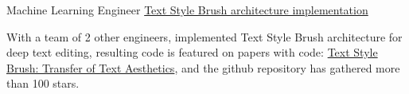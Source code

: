 

\begin{cventries}

  \cventry
  {Machine Learning Engineer} %
  {\href{https://github.com/grenlayk/deep-text-edit}{Text Style Brush architecture implementation}} %
  {} %
  {} %
  {
    \begin{cvitems} %
      \item With a team of 2 other engineers, implemented Text Style Brush architecture for deep text editing, resulting code is featured on papers with code: \href{https://web.archive.org/web/20240412013814/https://paperswithcode.com/paper/textstylebrush-transfer-of-text-aesthetics}{Text Style Brush: Transfer of Text Aesthetics}, and the github repository has gathered more than 100 stars.
    \end{cvitems}
  }

\end{cventries}
